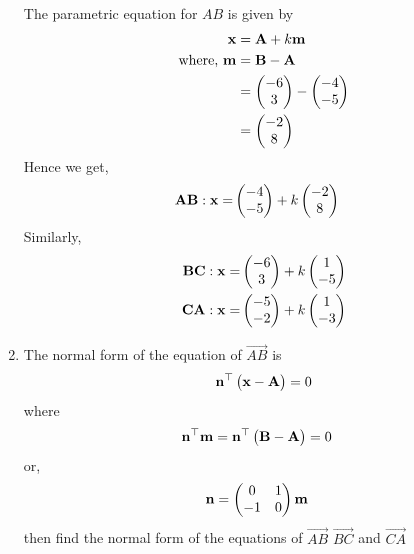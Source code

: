 \documentclass[11pt]{book}
\begin{document}
\begin{enumerate}[label=\thesection.\arabic*.,ref=\thesection.\theenumi]
	\solution\\
	The parametric equation for $AB$ is given by
	\begin{align}
		\mathbf{x} &= \mathbf{A} + k\mathbf{m}\\
		\text{where, } \mathbf{m} &= \mathbf{B} -\mathbf{A}\\
		&= \begin{pmatrix}-6 \\ 3\end{pmatrix} -\begin{pmatrix}-4 \\ -5\end{pmatrix}\\
		&= \begin{pmatrix}-2 \\ 8\end{pmatrix}
	\end{align}
	Hence we get,
	\begin{align}
		\mathbf{AB}: \mathbf{x} = &\begin{pmatrix}-4\\-5\end{pmatrix} + k \begin{pmatrix}-2\\8\end{pmatrix}
	\end{align}
	Similarly, 
	\begin{align}
		\mathbf{BC}: \mathbf{x} = &\begin{pmatrix}-6\\3\end{pmatrix} + k \begin{pmatrix}1\\-5\end{pmatrix}\\
		\mathbf{CA}: \mathbf{x} = &\begin{pmatrix}-5\\-2\end{pmatrix} + k \begin{pmatrix}1\\-3\end{pmatrix}
	\end{align}

\item The normal form of the equation of $\vec{AB}$ is
\begin{align}
\mathbf{n}^{\top}\begin{pmatrix}\mathbf{x}-\mathbf{A}\end{pmatrix}=0
\end{align}
where
\begin{align}
\mathbf{n}^{\top}\mathbf{m}&=\mathbf{n}^{\top}\begin{pmatrix}\mathbf{B}-\mathbf{A}\end{pmatrix}=0
\end{align} 
or,\begin{align}
\mathbf{n}&=\begin{pmatrix}0 &1 \\-1 & 0\end{pmatrix}\mathbf{m}
\end{align}
then find the normal form of the equations of $\vec{AB}$ $\vec{BC}$ and $\vec{CA}$


\end{enumerate}
\end{document}
